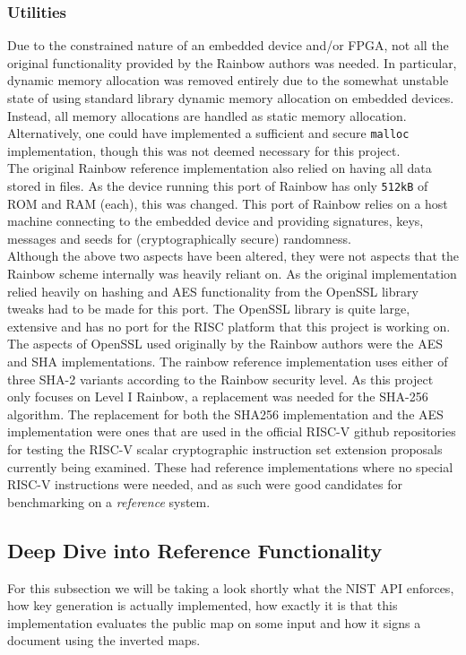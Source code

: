 \subsubsection{Utilities} \label{utils}
Due to the constrained nature of an embedded device and/or FPGA, not all the original functionality provided by the Rainbow authors was needed. In particular, dynamic memory allocation was removed entirely due to the somewhat unstable state of using standard library dynamic memory allocation on embedded devices. Instead, all memory allocations are handled as static memory allocation. Alternatively, one could have implemented a sufficient and secure \texttt{malloc} implementation, though this was not deemed necessary for this project.\medskip\\
The original Rainbow reference implementation also relied on having all data stored in files. As the device running this port of Rainbow has only \texttt{512kB} of ROM and RAM (each), this was changed. This port of Rainbow relies on a host machine connecting to the embedded device and providing signatures, keys, messages and seeds for (cryptographically secure) randomness.\medskip\\
Although the above two aspects have been altered, they were not aspects that the Rainbow scheme internally was heavily reliant on. As the original implementation relied heavily on hashing and AES functionality from the OpenSSL library tweaks had to be made for this port. The OpenSSL library is quite large, extensive and has no port for the RISC platform that this project is working on.
\medskip\\
The aspects of OpenSSL used originally by the Rainbow authors were the AES and SHA implementations. The rainbow reference implementation uses either of three SHA-2 variants according to the Rainbow security level. \cite{rainbownist} As this project only focuses on Level I Rainbow, a replacement was needed for the SHA-256 algorithm. The replacement for both the SHA256 implementation and the AES implementation were ones that are used in the official RISC-V github repositories for testing the RISC-V scalar cryptographic instruction set extension proposals currently being examined. \cite{riscvcrypt} These had reference implementations where no special RISC-V instructions were needed, and as such were good candidates for benchmarking on a \textit{reference} system.

\subsection{Deep Dive into Reference Functionality} \label{deepdive}
For this subsection we will be taking a look shortly what the NIST API enforces, how key generation is actually implemented, how exactly it is that this implementation evaluates the public map on some input and how it signs a document using the inverted maps.

